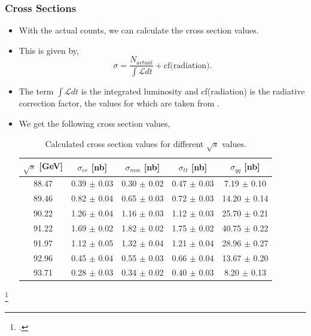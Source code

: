\documentclass[10pt]{beamer}
\begin{document}
\begin{frame}
\frametitle{Cross Sections}
\begin{itemize}
  \item With the actual counts, we can calculate the cross section values.
  \item This is given by,
  \begin{equation}
    \sigma = \frac{N_{actual}}{\int \mathcal{L} dt} + \text{cf(radiation)}.
  \end{equation}
  \item The term $\int \mathcal{L} dt$ is the integrated luminosity and cf(radiation) is the radiative correction factor, the values for which are taken from \footnotemark{}.
  \item We get the following cross section values,
  \begin{table}[!h]
    \centering
    \begin{tabular}{c|cccc}
    \hline
    $\sqrt{s}$ {[}GeV{]} & $\sigma_{ee}$ {[}nb{]} & $\sigma_{mm}$ {[}nb{]} & $\sigma_{tt}$ {[}nb{]} & $\sigma_{qq}$ {[}nb{]} \\
    \hline
    88.47                & 0.39 $\pm$ 0.03        & 0.30 $\pm$ 0.02        & 0.47 $\pm$ 0.03        & 7.19 $\pm$ 0.10        \\
    89.46                & 0.82 $\pm$ 0.04        & 0.65 $\pm$ 0.03        & 0.72 $\pm$ 0.03        & 14.20 $\pm$ 0.14       \\
    90.22                & 1.26 $\pm$ 0.04        & 1.16 $\pm$ 0.03        & 1.12 $\pm$ 0.03        & 25.70 $\pm$ 0.21       \\
    91.22                & 1.69 $\pm$ 0.02        & 1.82 $\pm$ 0.02        & 1.75 $\pm$ 0.02        & 40.75 $\pm$ 0.22       \\
    91.97                & 1.12 $\pm$ 0.05        & 1.32 $\pm$ 0.04        & 1.21 $\pm$ 0.04        & 28.96 $\pm$ 0.27       \\
    92.96                & 0.45 $\pm$ 0.04        & 0.55 $\pm$ 0.03        & 0.66 $\pm$ 0.04        & 13.67 $\pm$ 0.20       \\
    93.71                & 0.28 $\pm$ 0.03        & 0.34 $\pm$ 0.02        & 0.40 $\pm$ 0.03        & 8.20 $\pm$ 0.13       \\
    \hline
    \end{tabular}
    \caption{Calculated cross section values for different $\sqrt{s}$ values.}
    \label{table:cross-section}
  \end{table}
\end{itemize}
\footcitetext{UB}
\end{frame}
\end{document}
